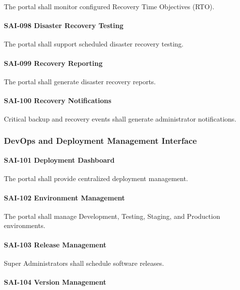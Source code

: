 The portal shall monitor configured Recovery Time Objectives (RTO).

\paragraph{SAI-098 Disaster Recovery Testing}

The portal shall support scheduled disaster recovery testing.

\paragraph{SAI-099 Recovery Reporting}

The portal shall generate disaster recovery reports.

\paragraph{SAI-100 Recovery Notifications}

Critical backup and recovery events shall generate administrator
notifications.


\subsubsection*{DevOps and Deployment Management Interface}

\paragraph{SAI-101 Deployment Dashboard}

The portal shall provide centralized deployment management.

\paragraph{SAI-102 Environment Management}

The portal shall manage Development, Testing, Staging, and Production
environments.

\paragraph{SAI-103 Release Management}

Super Administrators shall schedule software releases.

\paragraph{SAI-104 Version Management}

